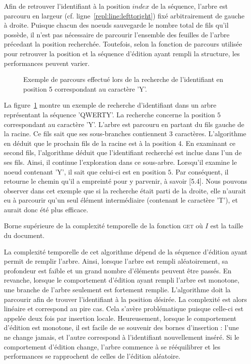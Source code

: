 Afin de retrouver l'identifiant à la position $index$ de la séquence, l'arbre
est parcouru en largeur (cf. ligne~\ref{repl:line:lefttoright}) fixé
arbitrairement de gauche à droite.  Puisque chacun des noeuds sauvegarde le
nombre total de fils qu'il possède, il n'est pas nécessaire de parcourir
l'ensemble des feuilles de l'arbre précedant la position recherchée. Toutefois,
selon la fonction de parcours utilisée pour retrouver la position et la séquence
d'édition ayant rempli la structure, les performances peuvent varier.

\begin{figure}
  \centering
  
  \caption{\label{repl:fig:getexample} Exemple de parcours effectué lors de la
    recherche de l'identifiant en position 5 correspondant au caractère 'Y'.}
\end{figure}

La figure~\ref{repl:fig:getexample} montre un exemple de recherche d'identifiant
dans un arbre représentant la séquence 'QWERTY'. La recherche concerne la
position $5$ correspondant au caractère 'Y'. L'arbre est parcouru en partant du
fils gauche de la racine. Ce fils sait que ses sous-branches contiennent 3
caractères. L'algorithme en déduit que le prochain fils de la racine est à la
position 4. En examinant ce second fils, l'algorithme déduit que l'identifiant
recherché est inclue dans l'un de ses fils. Ainsi, il continue l'exploration
dans ce sous-arbre. Lorsqu'il examine le noeud contenant 'Y', il sait que
celui-ci est en position $5$. Par conséquent, il retourne le chemin qu'il a
empreinté pour y parvenir, à savoir [5.4]. Nous pouvons observer dans cet
exemple que si la recherche était parti de la droite, elle n'aurait eu à
parcourir qu'un seul élément intermédiaire (contenant le caractère 'T'), et
aurait donc été plus efficace.


\begin{wraptable}{r}{0.5\textwidth}
  
  \caption{\label{repl:table:get} Borne supérieure de la complexité temporelle de la fonction \textsc{get} où $I$ est la taille du document.}  
\end{wraptable}

La complexité temporelle de cet algorithme dépend de la séquence d'édition ayant
permit de remplir l'arbre. Ainsi, lorsque l'arbre est rempli aléatoirement, sa
profondeur est faible et un grand nombre d'éléments peuvent être passés. En
revanche, lorsque le comportement d'édition ayant rempli l'arbre est monotone,
une branche de l'arbre seulement est fortement remplie. L'algorithme doit la
parcourir afin de trouver l'identifiant à la position désirée. La complexité est
alors linéaire et correspond au pire cas. Cela s'avère problématique puisque
celle-ci est appelée deux fois par insertion locale. Heureusement, lorsque le
comportement d'édition est monotone, il est facile de se souvenir des bornes
d'insertion : l'une ne change jamais, et l'autre correspond à l'identifiant
nouvellement inséré. Si le comportement d'édition change, l'arbre commence à se
rééquilibrer et les performances se rapprochent de celles de l'édition
aléatoire.


